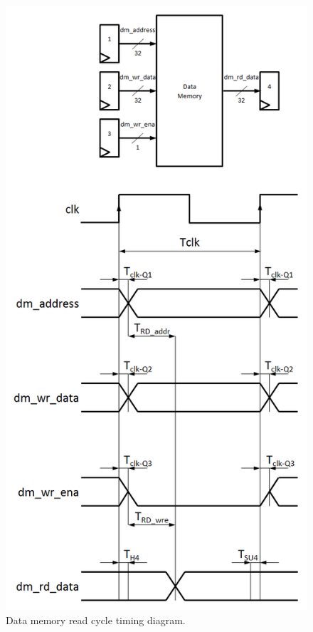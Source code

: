 \begin{figure}
\begin{center}
\includegraphics[scale=0.55]{./figures/dm_rd_timing.png}
\end{center}
\caption{Data memory read cycle timing diagram.}
\label{fig:dm_rd_timing}
\end{figure}

